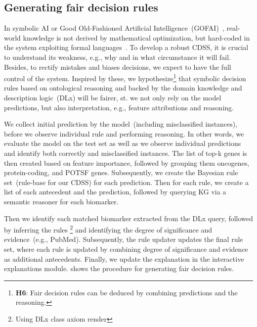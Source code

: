 \subsection{Generating fair decision rules}
In symbolic AI or Good Old-Fashioned Artificial Intelligence~(GOFAI)~\cite{GoFI}, real-world knowledge is not derived by mathematical optimization, but hard-coded in the system exploiting formal languages~\cite{futia2020integration}. To develop a robust CDSS, it is crucial to understand its weakness, e.g., why and in what circumstance it will fail. Besides, to rectify mistakes and biases decisions, we expect to have the full control of the system. Inspired by these, we hypothesize\footnote{\textbf{H6}: Fair decision rules can be deduced by combining predictions and the reasoning.} that symbolic decision rules based on ontological reasoning and backed by the domain knowledge and description logic~(DLx) will be fairer, st. we not only rely on the model predictions, but also interpretation, e.g., feature attributions and reasoning. 

\hspace*{3.5mm} We collect initial prediction by the model~(including misclassified instances), before we observe individual rule and performing reasoning. 
In other words, we evaluate the model on the test set as well as we observe individual predictions and identify both correctly and misclassified instances. The list of top-k genes is then created based on feature importance, followed by grouping them oncogenes, protein-coding, and POTSF genes. Subsequently, we create the Bayesian rule set~(rule-base for our CDSS) for each prediction. Then for each rule, we create a list of each antecedent and the prediction, followed by querying KG via a semantic reasoner for each biomarker.

\hspace*{3.5mm} Then we identify each matched biomarker extracted from the  DLx query, followed by inferring the rules \footnote{Using DLx class axiom render} and identifying the degree of significance and evidence~(e.g., PubMed). Subsequently, the rule updater updates the final rule set, where each rule is updated by combining degree of significance and evidence as additional antecedents. Finally, we update the explanation in the interactive explanations module.  shows the procedure for generating fair decision rules. 

